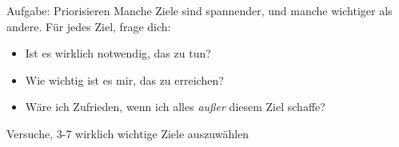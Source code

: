 \begin{frame}[c]{Aufgabe: Priorisieren}
    Manche Ziele sind spannender, und manche wichtiger als andere. Für jedes
    Ziel, frage dich:
    \begin{itemize}[<+(1)->]
        \item Ist es wirklich notwendig, das zu tun?
        \item Wie wichtig ist es mir, das zu erreichen?
        \item Wäre ich Zufrieden, wenn ich alles {\em außer} diesem Ziel schaffe?
    \end{itemize} \pause
    Versuche, 3-7 wirklich wichtige Ziele auszuwählen
\end{frame}



